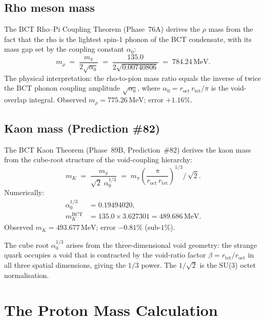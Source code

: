 \documentclass[twocolumn,10pt,a4paper]{article}
\begin{document}
\subsection{Rho meson mass}
The BCT Rho--Pi Coupling Theorem (Phase~76A) derives the $\rho$ mass from
the fact that the rho is the lightest spin-1 phonon of the BCT condensate,
with its mass gap set by the coupling constant $\alpha_0$:
\begin{equation}
  \label{eq:mrho}
  m_\rho \;=\; \frac{m_\pi}{2\sqrt{\alpha_0}}
           \;=\; \frac{135.0}{2\sqrt{0.00740806}}
           \;=\; 784.24\,\mathrm{MeV}.
\end{equation}
The physical interpretation: the rho-to-pion mass ratio equals the
inverse of twice the BCT phonon coupling amplitude $\sqrt{\alpha_0}$,
where $\alpha_0 = r_\mathrm{oct}\,r_\mathrm{tet}/\pi$ is the
void-overlap integral.  Observed $m_\rho = 775.26\,\mathrm{MeV}$;
error $+1.16\%$.

\subsection{Kaon mass (Prediction \#82)}
The BCT Kaon Theorem (Phase~89B, Prediction~\#82) derives the kaon mass
from the cube-root structure of the void-coupling hierarchy:
\begin{equation}
  \label{eq:mK}
  m_K \;=\; \frac{m_\pi}{\sqrt{2}\;\alpha_0^{1/3}}
       \;=\; m_\pi \left(\frac{\pi}{r_\mathrm{oct}\,r_\mathrm{tet}}\right)^{\!1/3}
             \!\!\!/\,\sqrt{2}.
\end{equation}
Numerically:
\begin{align*}
  \alpha_0^{1/3} &= 0.19494020,\\
  m_K^\mathrm{BCT} &= 135.0 \times 3.627301 = 489.686\,\mathrm{MeV}.
\end{align*}
Observed $m_K = 493.677\,\mathrm{MeV}$; error $-0.81\%$ (sub-$1\%$).

The cube root $\alpha_0^{1/3}$ arises from the three-dimensional void
geometry: the strange quark occupies a void that is contracted by the
void-ratio factor $\beta = r_\mathrm{tet}/r_\mathrm{oct}$ in all three spatial
dimensions, giving the $1/3$ power. The $1/\sqrt{2}$ is the SU(3) octet
normalisation.

\section{The Proton Mass Calculation}
\end{document}

